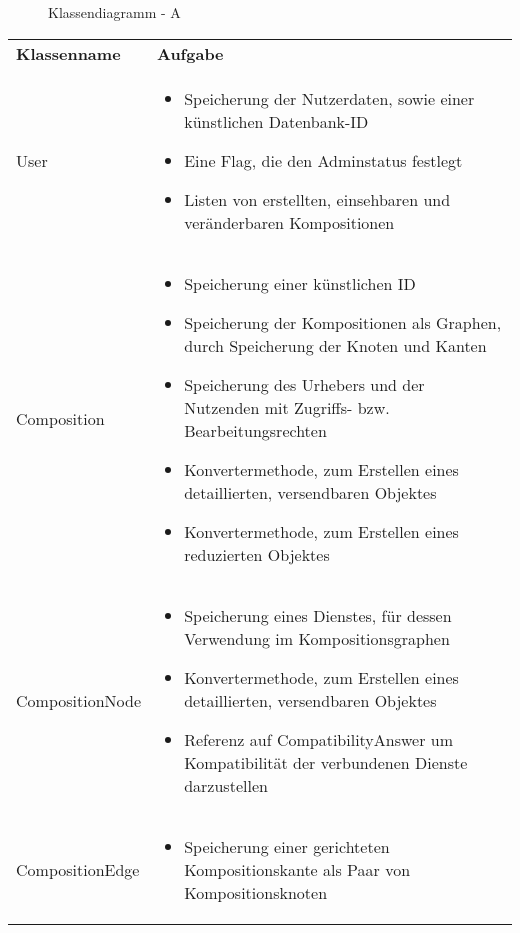 \makeatletter
\newcommand*{\compress}{\@minipagetrue}
\makeatother

\begin{figure}[h]
	\centering
	\caption{Klassendiagramm - A}
	\label{fig:klassendiagramm-a}
\end{figure}

\begin{table}[h]
	\centering
	\begin{tabularx}{\textwidth}{p{} | X}
		\rowcolor[HTML]{C0C0C0}
		\textbf{Klassenname} & \textbf{Aufgabe} \\
		User & \compress \begin{itemize}
			\item Speicherung der Nutzerdaten, sowie einer künstlichen Datenbank-ID
			\item Eine Flag, die den Adminstatus festlegt
			\item Listen von erstellten, einsehbaren und veränderbaren Kompositionen
		\end{itemize}\\
		\rowcolor[HTML]{E7E7E7}
		Composition & \compress \begin{itemize}
		  \item Speicherung einer künstlichen ID
			\item Speicherung der Kompositionen als Graphen, durch Speicherung der Knoten und Kanten
			\item Speicherung des Urhebers und der Nutzenden mit Zugriffs- bzw. Bearbeitungsrechten
			\item Konvertermethode, zum Erstellen eines detaillierten, versendbaren Objektes
			\item Konvertermethode, zum Erstellen eines reduzierten Objektes
		\end{itemize} \\
		CompositionNode & \compress \begin{itemize}
			\item Speicherung eines Dienstes, für dessen Verwendung im Kompositionsgraphen
			\item Konvertermethode, zum Erstellen eines detaillierten, versendbaren Objektes
			\item Referenz auf CompatibilityAnswer um Kompatibilität der verbundenen Dienste darzustellen
		\end{itemize} \\
		\rowcolor[HTML]{E7E7E7}
		CompositionEdge & \compress \begin{itemize}
			\item Speicherung einer gerichteten Kompositionskante als Paar von Kompositionsknoten

\end{itemize}
\end{tabularx}
\end{table}
